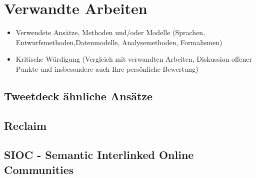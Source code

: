 
\chapter{Verwandte Arbeiten} %
\label{cha:verwandte_arbeiten}


\begin{itemize}
    \item Verwendete Ansätze, Methoden und/oder Modelle (Sprachen, Entwurfsmethoden,Datenmodelle, Analysemethoden, Formalismen)
    \item Kritische Würdigung (Vergleich mit verwandten Arbeiten, Diskussion offener Punkte und insbesondere auch Ihre persönliche Bewertung)
\end{itemize}

\section{Tweetdeck ähnliche Ansätze} %
\label{sec:tweetdeck_hnliche_ans_tze}


\section{Reclaim} %
\label{sec:reclaim}


\section{SIOC - Semantic Interlinked Online Communities} %
\label{sec:sioc}

